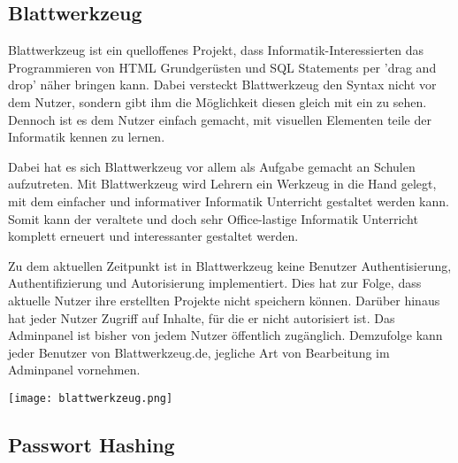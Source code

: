 \documentclass[11pt]{article}
\begin{document}
		\subsection{Blattwerkzeug}
		\label{sec:blattwerkzeug}
	
		\begin{flushleft}
			Blattwerkzeug ist ein quelloffenes Projekt, dass Informatik-Interessierten das Programmieren von HTML Grundgerüsten und SQL Statements per 'drag and drop' näher bringen kann. Dabei versteckt Blattwerkzeug den Syntax nicht vor dem Nutzer, sondern gibt ihm die Möglichkeit diesen gleich mit ein zu sehen. Dennoch ist es dem Nutzer einfach gemacht, mit visuellen Elementen teile der Informatik kennen zu lernen.\par\bigskip
			
			Dabei hat es sich Blattwerkzeug vor allem als Aufgabe gemacht an Schulen aufzutreten. Mit Blattwerkzeug wird Lehrern ein Werkzeug in die Hand gelegt, mit dem einfacher und informativer Informatik Unterricht gestaltet werden kann. Somit kann der veraltete und doch sehr Office-lastige Informatik Unterricht komplett erneuert und interessanter gestaltet werden.\par\bigskip
			
			Zu dem aktuellen Zeitpunkt ist in Blattwerkzeug keine Benutzer Authentisierung, Authentifizierung und Autorisierung implementiert. Dies hat zur Folge, dass aktuelle Nutzer ihre erstellten Projekte nicht speichern können. Darüber hinaus hat jeder Nutzer Zugriff auf Inhalte, für die er nicht autorisiert ist. Das Adminpanel ist bisher von jedem Nutzer öffentlich zugänglich. Demzufolge kann jeder Benutzer von Blattwerkzeug.de, jegliche Art von Bearbeitung im Adminpanel vornehmen.
		\end{flushleft}
	
		\begin{center}
			\texttt{[image: blattwerkzeug.png]}
		\end{center}


		\subsection{Passwort Hashing}
		\label{sec:password_hashing}
	
\end{document}
